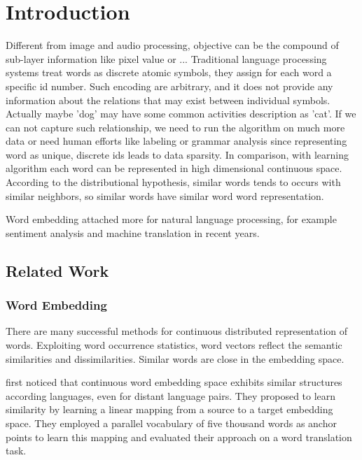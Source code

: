 
\chapter{Introduction}
Different from image and audio processing, objective can be the compound of sub-layer information like pixel value or ...
Traditional language processing systems treat words as discrete atomic symbols, they assign for each word a specific id number. Such encoding are arbitrary, and it does not provide any information about the relations that may exist between individual symbols. Actually maybe 'dog' may have some common activities description as 'cat'. If we can not capture such relationship, we need to run the algorithm on much more data or need human efforts like labeling or grammar analysis since representing word as unique, discrete ids leads to data sparsity.  
In comparison, with learning algorithm each word can be represented in high dimensional continuous space. 
According to the distributional hypothesis, similar words tends to occurs with similar neighbors, so similar words have similar word word representation.

Word embedding attached more for natural language processing, for example sentiment analysis and machine translation in recent years.



\section{Related Work}
\subsection{Word Embedding}
There are many successful methods \cite{mikolov2013efficient} \cite{mikolov2013distributed}for continuous distributed representation of words. Exploiting word occurrence statistics, word vectors reflect the semantic similarities and dissimilarities. Similar words are close in the embedding space. \cite{pennington2014glove}

 
\cite{bojanowski2016enriching}


\cite{mikolov2013exploiting} first noticed that continuous word embedding space exhibits similar structures according languages, even for distant language pairs. They proposed to learn similarity by learning a linear mapping from a source to a target embedding space. They employed a parallel vocabulary of five thousand words as anchor points to learn this mapping and evaluated their approach on a word translation task.

